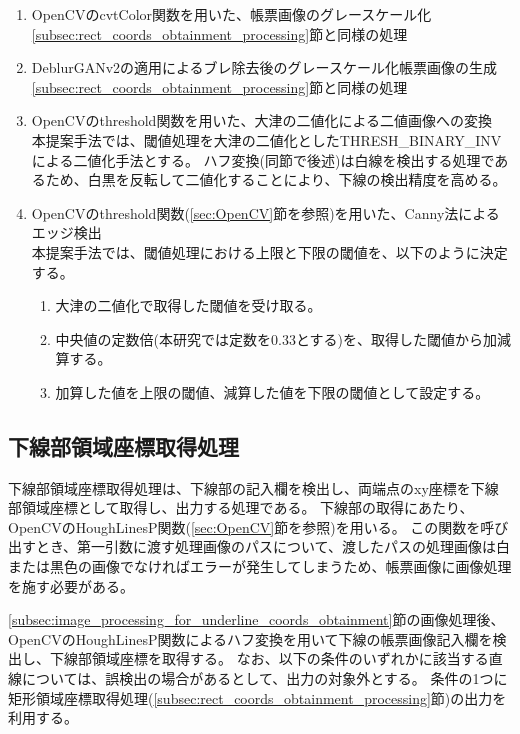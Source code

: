 \begin{enumerate}
    \item OpenCVのcvtColor関数を用いた、帳票画像のグレースケール化\\
        \ref{subsec:rect_coords_obtainment_processing}節と同様の処理
    \item DeblurGANv2の適用によるブレ除去後のグレースケール化帳票画像の生成\\
        \ref{subsec:rect_coords_obtainment_processing}節と同様の処理
    \item OpenCVのthreshold関数を用いた、大津の二値化による二値画像への変換\\
        本提案手法では、閾値処理を大津の二値化としたTHRESH\_BINARY\_INVによる二値化手法とする。
        ハフ変換(同節で後述)は白線を検出する処理であるため、白黒を反転して二値化することにより、下線の検出精度を高める。
    \item OpenCVのthreshold関数(\ref{sec:OpenCV}節を参照)を用いた、Canny法によるエッジ検出\\
        本提案手法では、閾値処理における上限と下限の閾値を、以下のように決定する。
        \begin{enumerate}
            \item 大津の二値化で取得した閾値を受け取る。
            \item 中央値の定数倍(本研究では定数を0.33とする)を、取得した閾値から加減算する。
            \item 加算した値を上限の閾値、減算した値を下限の閾値として設定する。
        \end{enumerate}
\end{enumerate}


\subsection{下線部領域座標取得処理}\label{subsec:underline_coords_obtainment_processing}
下線部領域座標取得処理は、下線部の記入欄を検出し、両端点のxy座標を下線部領域座標として取得し、出力する処理である。
下線部の取得にあたり、OpenCVのHoughLinesP関数(\ref{sec:OpenCV}節を参照)を用いる。
この関数を呼び出すとき、第一引数に渡す処理画像のパスについて、渡したパスの処理画像は白または黒色の画像でなければエラーが発生してしまうため、帳票画像に画像処理を施す必要がある。

\ref{subsec:image_processing_for_underline_coords_obtainment}節の画像処理後、OpenCVのHoughLinesP関数によるハフ変換を用いて下線の帳票画像記入欄を検出し、下線部領域座標を取得する。
なお、以下の条件のいずれかに該当する直線については、誤検出の場合があるとして、出力の対象外とする。
条件の1つに矩形領域座標取得処理(\ref{subsec:rect_coords_obtainment_processing}節)の出力を利用する。

